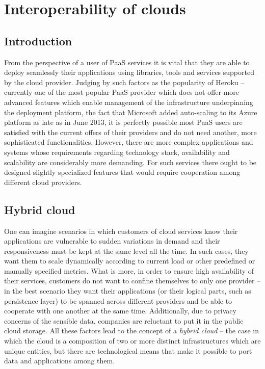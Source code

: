 \newpage
\section{Interoperability of clouds}

\subsection{Introduction}
From the perspective of a user of PaaS services it is vital that they are able to deploy seamlessly their applications using libraries, tools and services supported by the cloud provider\cite{MeGr11}. Judging by such factors as the popularity of Heroku -- currently one of the most popular PaaS provider which does not offer more advanced features which enable management of the infrastructure underpinning the deployment platform, the fact that Microsoft added auto-scaling to its Azure platform as late as in June 2013, it is perfectly possible most PaaS users are satisfied with the current offers of their providers and do not need another, more sophisticated functionalities. However, there are more complex applications and systems whose requirements regarding technology stack, availability and scalability are considerably more demanding. For such services there ought to be designed slightly specialized features that would require cooperation among different cloud providers.

\subsection{Hybrid cloud}
One can imagine scenarios in which customers of cloud services know their applications are vulnerable to sudden variations in demand and their responsiveness must be kept at the same level all the time. In such cases, they want them to scale dynamically according to current load or other predefined or manually specified metrics. What is more, in order to ensure high availability of their services, customers do not want to confine themselves to only one provider -- in the best scenario they want their applications (or their logical parts, such as persistence layer) to be spanned across different providers and be able to cooperate with one another at the same time. Additionally, due to privacy concerns of the sensible data, companies are reluctant to put it in the public cloud storage. All these factors lead to the concept of a \emph{hybrid cloud}\cite{MeGr11} -- the case in which the cloud is a composition of two or more distinct infrastructures which are unique entities, but there are technological means that make it possible to port data and applications among them.


